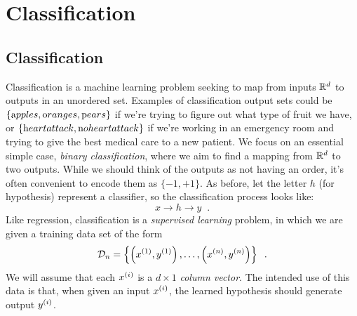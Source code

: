\chapter{Classification}
\label{chap-classification}

\section{Classification}

Classification is a machine learning problem seeking to map from
inputs $\mathbb{R}^d$ to outputs in an unordered set. 
Examples of classification output sets could be $\{{\text apples}, {\text oranges}, {\text pears}\}$ if we're
trying to figure out what type of fruit we have, or
$\{{\text heart attack}, {\text no heart attack}\}$ if we're working in an emergency
room and trying to give the best medical care to a new patient.
We focus on an essential simple
case, {\em binary classification}, where we aim to find a mapping from $\mathbb{R}^d$ to
two outputs. 
While we should think of the outputs as not having an order, it's
often convenient to encode them as $\{-1, +1\}$.  As before, let the letter $h$ (for
hypothesis) represent a classifier, so the classification process
looks like:
$$ x \rightarrow \boxed{h} \rightarrow y \;\;.$$
%
%
Like regression, classification is a {\em{supervised learning}} problem, in which we
are given a training data set of the form
\[ {\cal D}_n = \left\{\left(x^{(1)}, y^{(1)}\right), \dots, \left(x^{(n)},
  y^{(n)}\right)\right\} \;\;.\]
We will assume that each $x^{(i)}$ is a $d \times 1$ {\em column
    vector}. The intended use of this data is that, when given an input
$x^{(i)}$, the learned hypothesis should generate output
$y^{(i)}$.

